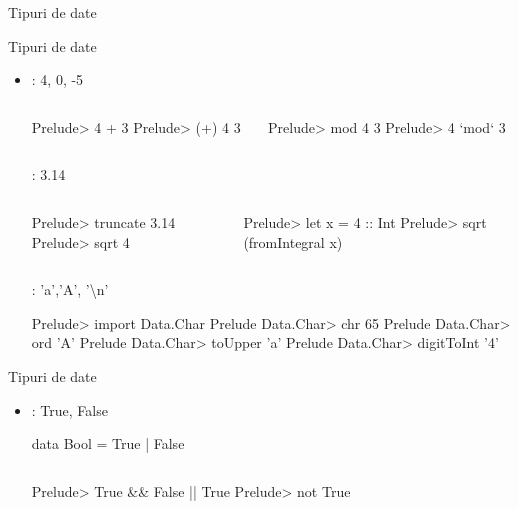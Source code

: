 \documentclass[xcolor=pdftex,romanian,colorlinks]{beamer}
\begin{document}
\begin{section}{Tipuri de date}
\begin{frame}[fragile]{Tipuri de date}
\begin{itemize}
\item{}:  4, 0, -5
\begin{columns}
\begin{column}{0.4\textwidth}
\begin{asciihs}
Prelude> 4 + 3
Prelude> (+) 4 3
\end{asciihs}
\end{column}
\begin{column}{0.4\textwidth}
\begin{asciihs}
Prelude> mod 4 3
Prelude>  4 `mod` 3
\end{asciihs}
\end{column}
\end{columns}
\vitem{}:  3.14
\begin{columns}
\begin{column}{0.4\textwidth}
\begin{asciihs}
Prelude> truncate 3.14
Prelude> sqrt 4
\end{asciihs}
\end{column}
\begin{column}{0.5\textwidth}
\begin{asciihs}
Prelude> let x = 4 :: Int
Prelude> sqrt (fromIntegral x)
\end{asciihs}
\end{column}
\end{columns}
\vitem{}: 'a','A', '\textbackslash n'
\begin{asciihs}
Prelude> import Data.Char
Prelude Data.Char> chr 65
Prelude Data.Char> ord 'A'
Prelude Data.Char> toUpper 'a'
Prelude Data.Char> digitToInt '4'
\end{asciihs}
\end{itemize}
\end{frame}

\begin{frame}[fragile]{Tipuri de date}
\begin{itemize}
\item{}:  True, False
\begin{asciihs}
data Bool = True | False
\end{asciihs}
\begin{columns}
\begin{column}{0.5\textwidth}
\begin{asciihs}
Prelude> True && False || True
Prelude> not True


\end{asciihs}
\end{column}
\end{columns}
\end{itemize}
\end{frame}
\end{section}
\end{document}

